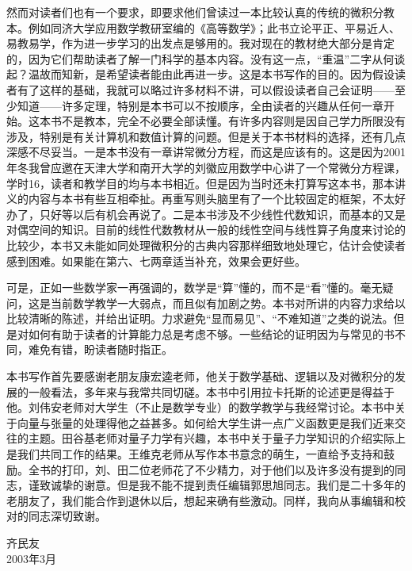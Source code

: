 然而对读者们也有一个要求，即要求他们曾读过一本比较认真的传统的微积分教本。例如同济大学应用数学教研室编的《高等数学》；此书立论平正、平易近人、易教易学，作为进一步学习的出发点是够用的。我对现在的教材绝大部分是肯定的，因为它们帮助读者了解一门科学的基本内容。没有这一点，“重温”二字从何谈起？温故而知新，是希望读者能由此再进一步。这是本书写作的目的。因为假设读者有了这样的基础，我就可以略过许多材料不讲，可以假设读者自己会证明——至少知道——许多定理，特别是本书可以不按顺序，全由读者的兴趣从任何一章开始。这本书不是教本，完全不必要全部读懂。有许多内容则是因自己学力所限没有涉及，特别是有关计算机和数值计算的问题。但是关于本书材料的选择，还有几点深感不尽妥当。一是本书没有一章讲常微分方程，而这是应该有的。这是因为2001年冬我曾应邀在天津大学和南开大学的刘徽应用数学中心讲了一个常微分方程课，学时16，读者和教学目的均与本书相近。但是因为当时还未打算写这本书，那本讲义的内容与本书有些互相牵扯。再重写则头脑里有了一个比较固定的框架，不太好办了，只好等以后有机会再说了。二是本书涉及不少线性代数知识，而基本的又是对偶空间的知识。目前的线性代数教材从一般的线性空间与线性算子角度来讨论的比较少，本书又未能如同处理微积分的古典内容那样细致地处理它，估计会使读者感到困难。如果能在第六、七两章适当补充，效果会更好些。

可是，正如一些数学家一再强调的，数学是“算”懂的，而不是“看”懂的。毫无疑问，这是当前数学教学一大弱点，而且似有加剧之势。本书对所讲的内容力求给以比较清晰的陈述，并给出证明。力求避免“显而易见”、“不难知道”之类的说法。但是对如何有助于读者的计算能力总是考虑不够。一些结论的证明因为与常见的书不同，难免有错，盼读者随时指正。

本书写作首先要感谢老朋友康宏逵老师，他关于数学基础、逻辑以及对微积分的发展的一般看法，多年来与我常共同切磋。本书中引用拉卡托斯的论述更是得益于他。刘伟安老师对大学生（不止是数学专业）的数学教学与我经常讨论。本书中关于向量与张量的处理得他之益甚多。如何给大学生讲一点广义函数更是我们近来交往的主题。田谷基老师对量子力学有兴趣，本书中关于量子力学知识的介绍实际上是我们共同工作的结果。王维克老师从写作本书意念的萌生，一直给予支持和鼓励。全书的打印，刘、田二位老师花了不少精力，对于他们以及许多没有提到的同志，谨致诚挚的谢意。但是我不能不提到责任编辑郭思旭同志。我们是二十多年的老朋友了，我们能合作到退休以后，想起来确有些激动。同样，我向从事编辑和校对的同志深切致谢。

\enlargethispage{1.5\baselineskip}
\begin{flushright}
\begin{minipage}{0.22\textwidth}
\raggedleft
齐民友\\[1mm]
2003年3月
\end{minipage}
\end{flushright}

\clearpage
\tableofcontents
